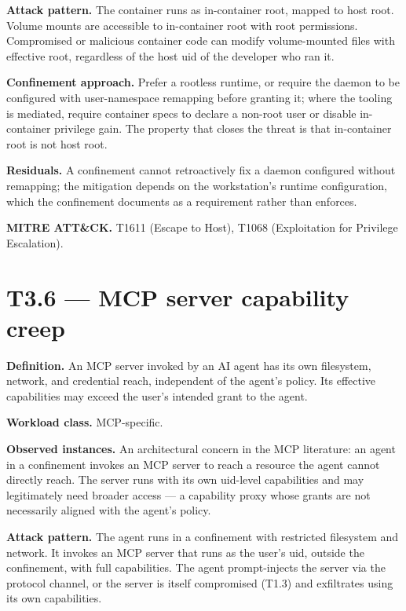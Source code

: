 \textbf{Attack pattern.} The container runs as in-container root, mapped
to host root. Volume mounts are accessible to in-container root with
root permissions. Compromised or malicious container code can modify
volume-mounted files with effective root, regardless of the host uid of
the developer who ran it.

\textbf{Confinement approach.} Prefer a rootless runtime, or require the
daemon to be configured with user-namespace remapping before granting
it; where the tooling is mediated, require container specs to declare a
non-root user or disable in-container privilege gain. The property that
closes the threat is that in-container root is not host root.

\textbf{Residuals.} A confinement cannot retroactively fix a daemon
configured without remapping; the mitigation depends on the
workstation's runtime configuration, which the confinement documents as
a requirement rather than enforces.

\textbf{MITRE ATT\&CK.} T1611 (Escape to Host), T1068 (Exploitation for
Privilege Escalation).

\hypertarget{t3.6-mcp-server-capability-creep}{%
\section{T3.6 --- MCP server capability
creep}\label{t3.6-mcp-server-capability-creep}}

\textbf{Definition.} An MCP server invoked by an AI agent has its own
filesystem, network, and credential reach, independent of the agent's
policy. Its effective capabilities may exceed the user's intended grant
to the agent.

\textbf{Workload class.} MCP-specific.

\textbf{Observed instances.} An architectural concern in the MCP
literature: an agent in a confinement invokes an MCP server to reach a
resource the agent cannot directly reach. The server runs with its own
uid-level capabilities and may legitimately need broader access --- a
capability proxy whose grants are not necessarily aligned with the
agent's policy.

\textbf{Attack pattern.} The agent runs in a confinement with restricted
filesystem and network. It invokes an MCP server that runs as the user's
uid, outside the confinement, with full capabilities. The agent
prompt-injects the server via the protocol channel, or the server is
itself compromised (T1.3) and exfiltrates using its own capabilities.

